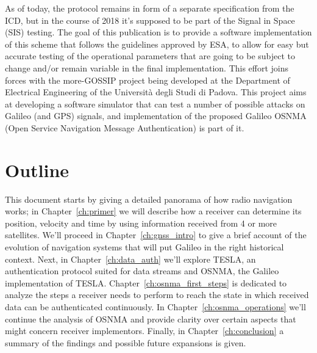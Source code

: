 \vspace{\baselineskip}

As of today, the protocol remains in form of a separate specification from the
ICD, but in the course of 2018 it's supposed to be part of the Signal in Space
(SIS) testing. The goal of this publication is to provide a software
implementation of this scheme that follows the guidelines approved by ESA, to
allow for easy but accurate testing of the operational parameters that are going
to be subject to change and/or remain variable in the final implementation. This
effort joins forces with the more-GOSSIP project being developed at the
Department of Electrical Engineering of the Università degli Studi di Padova.
This project aims at developing a software simulator that can test a number of
possible attacks on Galileo (and GPS) signals, and implementation of the
proposed Galileo OSNMA (Open Service Navigation Message Authentication) is part
of it.

\section{Outline}

This document starts by giving a detailed panorama of how radio navigation
works; in Chapter~\ref{ch:primer} we will describe how a receiver can determine
its position, velocity and time by using information received from 4 or more
satellites. We'll proceed in Chapter~\ref{ch:gnss_intro} to give a brief account
of the evolution of navigation systems that will put Galileo in the right
historical context. Next, in Chapter~\ref{ch:data_auth} we'll explore TESLA, an
authentication protocol suited for data streams and OSNMA, the Galileo
implementation of TESLA. Chapter~\ref{ch:osnma_first_steps} is dedicated to analyze
the steps a receiver needs to perform to reach the state in which received data
can be authenticated continuously. In Chapter~\ref{ch:osnma_operations} we'll
continue the analysis of OSNMA and provide clarity over certain aspects that might
concern receiver implementors. Finally, in Chapter~\ref{ch:conclusion} a summary
of the findings and possible future expansions is given.
